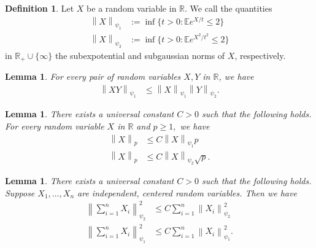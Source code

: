\documentclass{article}
\newcommand{\1}{\mathbbm{1}}
\newcommand{\norm}[1]{\left\lVert#1\right\rVert}
\theoremstyle{plain}
\newtheorem{lemma}[theorem]{Lemma}
\theoremstyle{definition}
\newtheorem{definition}[theorem]{Definition}
\theoremstyle{remark}
\newcommand{\E}{\mathbb{E}}
\newcommand{\R}{\mathbb{R}}
\begin{document}
\begin{definition}\label{defn:subgaussian-subexponential-norms}
Let $X$ be a random variable in $\R.$ We call the quantities
\begin{align*}
    \norm{X}_{\psi_1} &:= \inf\{t>0 : \E e^{X/t}\leq 2\} \\
    \norm{X}_{\psi_2} &:= \inf\{t>0 : \E e^{X^2/t^2}\leq 2\}
\end{align*}
in $\R_+ \cup \{\infty\}$ the subexpotential and subgaussian norms of $X$, respectively.
\end{definition}

\begin{lemma}\label{lem:prod-of-subgaussians}
For every pair of random variables $X,Y$ in $\R$, we have
\begin{align*}
    \norm{XY}_{\psi_1} &\leq \norm{X}_{\psi_1}\norm{Y}_{\psi_2}.
\end{align*}
\end{lemma}

\begin{lemma}\label{lem:subgaussian-subexp-moments}
 There exists a universal constant $C>0$ such that the following holds. For every random variable $X$ in $\R$ and $p\geq 1,$ we have 
 \begin{align*}
     \norm{X}_{p} &\leq C \norm{X}_{\psi_1} p \\
     \norm{X}_{p} &\leq C \norm{X}_{\psi_2} \sqrt{p}.
 \end{align*}
\end{lemma}

\begin{lemma}\label{lem:sum-subgaussian-subexp}
    There exists a universal constant $C>0$ such that the following holds. Suppose $X_1,\dots,X_n$ are independent, centered random variables. Then we have 
    \begin{align*}
        \norm{\sum_{i=1}^n X_i}_{\psi_2}^2 &\leq C\sum_{i=1}^n \norm{X_i}_{\psi_2}^2 \\
        \norm{\sum_{i=1}^n X_i}_{\psi_1}^2 &\leq C\sum_{i=1}^n \norm{X_i}_{\psi_1}^2.
    \end{align*}
\end{lemma}
\end{document}
